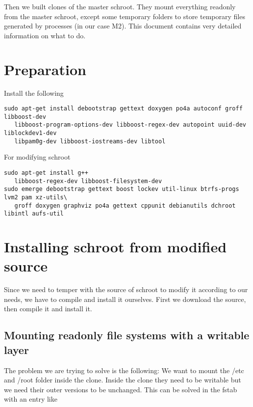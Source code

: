 \documentclass[a4paper]{book}
\begin{document}
Then we built clones of the master schroot. They mount everything readonly from
the master schroot, except some temporary folders to store temporary files
generated by processes (in our case M2). This document contains very detailed
information on what to do.

\section{Preparation}

Install the following

\begin{verbatim}
sudo apt-get install debootstrap gettext doxygen po4a autoconf groff libboost-dev
   libboost-program-options-dev libboost-regex-dev autopoint uuid-dev liblockdev1-dev
   libpam0g-dev libboost-iostreams-dev libtool
\end{verbatim}

For modifying schroot

\begin{verbatim}
sudo apt-get install g++
   libboost-regex-dev libboost-filesystem-dev
sudo emerge debootstrap gettext boost lockev util-linux btrfs-progs lvm2 pam xz-utils\ 
   groff doxygen graphviz po4a gettext cppunit debianutils dchroot libintl aufs-util
\end{verbatim}

\section{Installing schroot from modified source}
Since we need to temper with the source of schroot to modify it according to our needs, we have to compile and install it ourselves. First we download the source, then compile it and install it.

\subsection{Mounting readonly file systems with a writable layer}
The problem we are trying to solve is the following: We want to mount the /etc
and /root folder inside the clone. Inside the clone they need to be writable
but we need their outer versions to be unchanged.  This can be solved in the
fstab with an entry like
\end{document}
